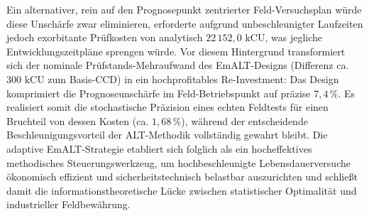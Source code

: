 Ein alternativer, rein auf den Prognosepunkt zentrierter Feld-Versuchsplan würde diese Unschärfe zwar eliminieren, erforderte aufgrund unbeschleunigter Laufzeiten jedoch exorbitante Prüfkosten von analytisch $22\,152{,}0\text{ kCU}$, was jegliche Entwicklungszeitpläne sprengen würde.
Vor diesem Hintergrund transformiert sich der nominale Prüfstands-Mehraufwand des \ac{EmALT}-Designs (Differenz ca. $300\text{ kCU}$ zum Basis-\ac{CCD}) in ein hochprofitables Re-Investment:
Das Design komprimiert die Prognoseunschärfe im Feld-Betriebspunkt auf präzise $7{,}4\,\%$. Es realisiert somit die stochastische Präzision eines echten Feldtests für einen Bruchteil von dessen Kosten (ca. $1{,}68\,\%$), während der entscheidende Beschleunigungsvorteil der \ac{ALT}-Methodik vollständig gewahrt bleibt.
Die adaptive \ac{EmALT}-Strategie etabliert sich folglich als ein hocheffektives methodisches Steuerungswerkzeug, um hochbeschleunigte Lebensdauerversuche ökonomisch effizient und sicherheitstechnisch belastbar auszurichten und schließt damit die informationstheoretische Lücke zwischen statistischer Optimalität und industrieller Feldbewährung.